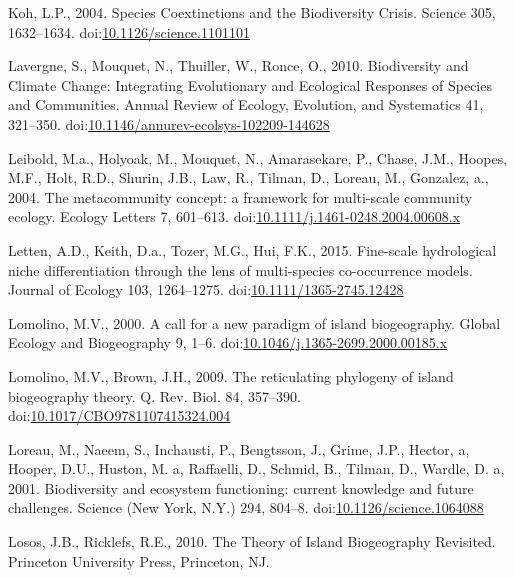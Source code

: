 \hypertarget{ref-Koh2004}{}
Koh, L.P., 2004. Species Coextinctions and the Biodiversity Crisis.
Science 305, 1632--1634.
doi:\href{https://doi.org/10.1126/science.1101101}{10.1126/science.1101101}

\hypertarget{ref-Lavergne2010}{}
Lavergne, S., Mouquet, N., Thuiller, W., Ronce, O., 2010. Biodiversity
and Climate Change: Integrating Evolutionary and Ecological Responses of
Species and Communities. Annual Review of Ecology, Evolution, and
Systematics 41, 321--350.
doi:\href{https://doi.org/10.1146/annurev-ecolsys-102209-144628}{10.1146/annurev-ecolsys-102209-144628}

\hypertarget{ref-Leibold2004}{}
Leibold, M.a., Holyoak, M., Mouquet, N., Amarasekare, P., Chase, J.M.,
Hoopes, M.F., Holt, R.D., Shurin, J.B., Law, R., Tilman, D., Loreau, M.,
Gonzalez, a., 2004. The metacommunity concept: a framework for
multi-scale community ecology. Ecology Letters 7, 601--613.
doi:\href{https://doi.org/10.1111/j.1461-0248.2004.00608.x}{10.1111/j.1461-0248.2004.00608.x}

\hypertarget{ref-Letten2015}{}
Letten, A.D., Keith, D.a., Tozer, M.G., Hui, F.K., 2015. Fine-scale
hydrological niche differentiation through the lens of multi-species
co-occurrence models. Journal of Ecology 103, 1264--1275.
doi:\href{https://doi.org/10.1111/1365-2745.12428}{10.1111/1365-2745.12428}

\hypertarget{ref-Lomolino2000}{}
Lomolino, M.V., 2000. A call for a new paradigm of island biogeography.
Global Ecology and Biogeography 9, 1--6.
doi:\href{https://doi.org/10.1046/j.1365-2699.2000.00185.x}{10.1046/j.1365-2699.2000.00185.x}

\hypertarget{ref-Lomolino2009}{}
Lomolino, M.V., Brown, J.H., 2009. The reticulating phylogeny of island
biogeography theory. Q. Rev. Biol. 84, 357--390.
doi:\href{https://doi.org/10.1017/CBO9781107415324.004}{10.1017/CBO9781107415324.004}

\hypertarget{ref-Loreau2001}{}
Loreau, M., Naeem, S., Inchausti, P., Bengtsson, J., Grime, J.P.,
Hector, a, Hooper, D.U., Huston, M. a, Raffaelli, D., Schmid, B.,
Tilman, D., Wardle, D. a, 2001. Biodiversity and ecosystem functioning:
current knowledge and future challenges. Science (New York, N.Y.) 294,
804--8.
doi:\href{https://doi.org/10.1126/science.1064088}{10.1126/science.1064088}

\hypertarget{ref-Losos2010}{}
Losos, J.B., Ricklefs, R.E., 2010. The Theory of Island Biogeography
Revisited. Princeton University Press, Princeton, NJ.

